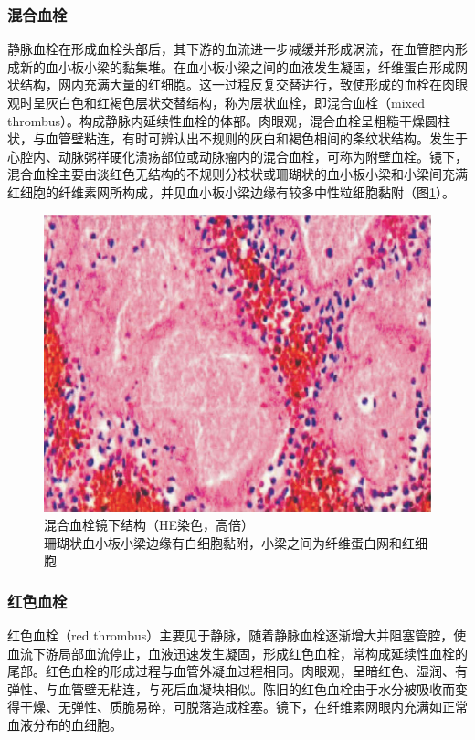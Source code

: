 \subsubsection{混合血栓}

静脉血栓在形成血栓头部后，其下游的血流进一步减缓并形成涡流，在血管腔内形成新的血小板小梁的黏集堆。在血小板小梁之间的血液发生凝固，纤维蛋白形成网状结构，网内充满大量的红细胞。这一过程反复交替进行，致使形成的血栓在肉眼观时呈灰白色和红褐色层状交替结构，称为层状血栓，即混合血栓（mixed
thrombus）。构成静脉内延续性血栓的体部。肉眼观，混合血栓呈粗糙干燥圆柱状，与血管壁粘连，有时可辨认出不规则的灰白和褐色相间的条纹状结构。发生于心腔内、动脉粥样硬化溃疡部位或动脉瘤内的混合血栓，可称为附壁血栓。镜下，混合血栓主要由淡红色无结构的不规则分枝状或珊瑚状的血小板小梁和小梁间充满红细胞的纤维素网所构成，并见血小板小梁边缘有较多中性粒细胞黏附（图\ref{fig3-7}）。

\begin{figure}[!htbp]
  \centering
  \includegraphics{./images/Image00040.jpg}
  \captionsetup{justification=centering}
  \caption{混合血栓镜下结构（HE染色，高倍） \\ {\small 珊瑚状血小板小梁边缘有白细胞黏附，小梁之间为纤维蛋白网和红细胞}}
  \label{fig3-7}
\end{figure}

\subsubsection{红色血栓}

红色血栓（red
thrombus）主要见于静脉，随着静脉血栓逐渐增大并阻塞管腔，使血流下游局部血流停止，血液迅速发生凝固，形成红色血栓，常构成延续性血栓的尾部。红色血栓的形成过程与血管外凝血过程相同。肉眼观，呈暗红色、湿润、有弹性、与血管壁无粘连，与死后血凝块相似。陈旧的红色血栓由于水分被吸收而变得干燥、无弹性、质脆易碎，可脱落造成栓塞。镜下，在纤维素网眼内充满如正常血液分布的血细胞。

